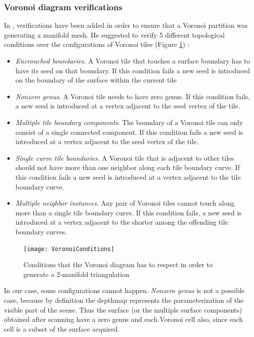 \documentclass[11pt,fleqn]{book} %
\begin{document}
\subsubsection{Voronoi diagram verifications}
In \cite{Gus07}, verifications have been added in order to ensure that a Voronoi partition was generating a manifold mesh.
He suggested to verify 5 different topological conditions over the configurations of Voronoi tiles (Figure \ref{fig:voronoi_conditions}) : 
\begin{itemize}
	\item \textit{Encrouched boundaries}. A Voronoi tile that touches a surface boundary has to have its seed on that boundary. 
	If this condition fails a new seed is introduced on the boundary of the surface within the current tile
	\item \textit{Nonzero genus}. A Voronoi tile needs to have zero genus. If this condition fails, a new seed is introduced at a vertex adjacent to the seed vertex of the tile.
	\item \textit{Multiple tile boundary components}. The boundary of a Voronoi tile can only consist of a single connected component. If this condition fails a new seed is introduced at a vertex adjacent to the seed vertex of the tile.
	\item \textit{Single curve tile boundaries}. A Voronoi tile that is adjacent to other tiles should not have more than one neighbor along each tile boundary curve. If this condition fails a new seed is introduced at a vertex adjacent to the tile boundary curve.
	\item \textit{Multiple neighbor instances}. Any pair of Voronoi tiles cannot touch along more than a single tile boundary curve. If this condition fails, a new seed is introduced at a vertex adjacent to the shorter among the offending tile boundary curves.
\end{itemize}

\begin{figure}[ht]
\centering\texttt{[image: VoronoiConditions]}
\caption{Conditions that the Voronoi diagram has to respect in order to generate a 2-manifold triangulation \cite{Gus07}}
\label{fig:voronoi_conditions}
\end{figure}

In our case, some configurations cannot happen.
\textit{Nonzero genus} is not a possible case, because by definition the depthmap represents the parameterization of the visible part of the scene. Thus the surface (or the multiple surface components) obtained after scanning have a zero genus and each Voronoi cell also, since each cell is a subset of the surface acquired.
\end{document}
